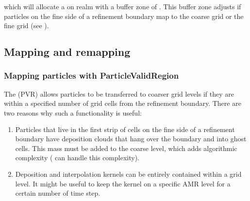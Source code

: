 \documentclass[letterpaper,10pt,english]{sphinxmanual}
\begin{document}
\begin{sphinxVerbatim}[commandchars=\\\{\},formatcom=\scriptsize]
  
        
\end{sphinxVerbatim}

\sphinxAtStartPar
which will allocate a  on realm  with a buffer zone of .
This buffer zone adjusts if particles on the fine side of a refinement boundary map to the coarse grid or the fine grid (see {\hyperref[\detokenize{Source/Particles:chap-particlemapping}]{}}).


\subsection{Mapping and remapping}
\label{\detokenize{Source/Particles:mapping-and-remapping}}\label{\detokenize{Source/Particles:chap-particlemapping}}

\subsubsection{Mapping particles with ParticleValidRegion}
\label{\detokenize{Source/Particles:mapping-particles-with-particlevalidregion}}
\sphinxAtStartPar
The  (PVR) allows particles to be transferred to coarser grid levels if they are within a specified number of grid cells from the refinement boundary.
There are two reasons why such a functionality is useful:
\begin{enumerate}
%
\item {} 
\sphinxAtStartPar
Particles that live in the first strip of cells on the fine side of a refinement boundary have deposition clouds that hang over the boundary and into ghost cells.
This mass must be added to the coarse level, which adds algorithmic complexity ( can handle this complexity).

\item {} 
\sphinxAtStartPar
Deposition and interpolation kernels can be entirely contained within a grid level.
It might be useful to keep the kernel on a specific AMR level for a certain number of time step.

\end{enumerate}
\end{document}
